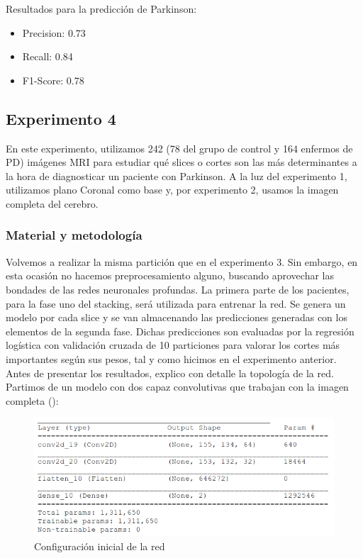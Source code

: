 Resultados para la predicción de Parkinson:

\begin{itemize}
	\item Precision: 0.73
	\item Recall: 0.84
	\item F1-Score: 0.78
\end{itemize}

 \newpage
\subsection{Experimento 4}

En este experimento, utilizamos 242 (78 del grupo de control y 164 enfermos de PD) imágenes MRI para estudiar qué slices o cortes son las más determinantes a la hora de diagnosticar un paciente con Parkinson. A la luz del experimento 1, utilizamos plano Coronal como base y, por experimento 2, usamos la imagen completa del cerebro.

\subsubsection{Material y metodología}

Volvemos a realizar la misma partición que en el experimento 3. Sin embargo, en esta ocasión no hacemos preprocesamiento alguno, buscando aprovechar las bondades de las redes neuronales profundas. La primera parte de los pacientes, para la fase uno del stacking, será utilizada para entrenar la red. Se genera un modelo por cada slice y se van almacenando las predicciones generadas con los elementos de la segunda fase. Dichas predicciones son evaluadas por la regresión logística con validación cruzada de 10 particiones para valorar los cortes más importantes según sus pesos, tal y como hicimos en el experimento anterior. \\

Antes de presentar los resultados, explico con detalle la topología de la red. Partimos de un modelo con dos capaz convolutivas que trabajan con la imagen completa (\cite{keras}):

\begin{figure}[H] %
	\centering
	\includegraphics[scale=0.6]{conf1.png}  %
	\caption{Configuración inicial de la red} 
	\label{fig:confnn1}
\end{figure}


